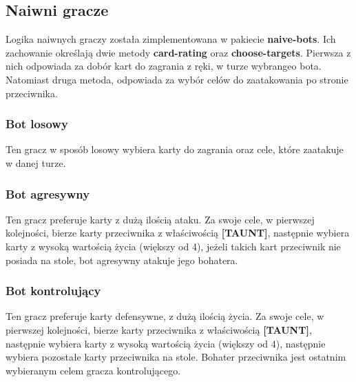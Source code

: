 \documentclass[a4paper, 12pt]{article}
\begin{document}
\subsection*{Naiwni gracze}
Logika naiwnych graczy została zimplementowana w pakiecie \textbf{naive-bots}. Ich zachowanie określają dwie metody \textbf{card-rating} oraz \textbf{choose-targets}. Pierwsza z nich odpowiada za dobór kart do zagrania z ręki, w turze wybrangeo bota. Natomiast druga metoda, odpowiada za wybór celów do zaatakowania po stronie przeciwnika.

\subsubsection*{Bot losowy}
Ten gracz w sposób losowy wybiera karty do zagrania oraz cele, które zaatakuje w danej turze.

\subsubsection*{Bot agresywny}
Ten gracz preferuje karty z dużą ilością ataku. Za swoje cele, w pierwszej kolejności, bierze karty przeciwnika z właściwością \textbf{[TAUNT]}, następnie wybiera karty z wysoką wartością życia (większy od 4), jeżeli takich kart przeciwnik nie posiada na stole, bot agresywny atakuje jego bohatera.

\subsubsection*{Bot kontrolujący}
Ten gracz preferuje karty defensywne, z dużą ilością życia. Za swoje cele, w pierwszej kolejności, bierze karty przeciwnika z właściwością \textbf{[TAUNT]}, następnie wybiera karty z wysoką wartością życia (większy od 4), następnie wybiera pozostałe karty przeciwnika na stole. Bohater przeciwnika jest ostatnim wybieranym celem gracza kontrolującego.
\end{document}
